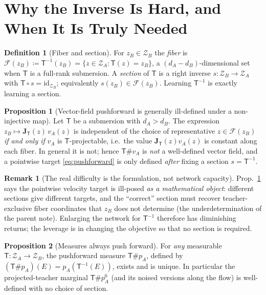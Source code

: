 \documentclass[11pt,a4paper]{article}
\newcommand{\Za}{\mathcal{Z}_{A}}
\newcommand{\Zb}{\mathcal{Z}_{B}}
\newcommand{\Tmap}{\mathsf{T}}
\newcommand{\Tinv}{\mathsf{T}^{-1}}
\newcommand{\push}{\#}
\newcommand{\Jac}{\mathbf{J}}
\theoremstyle{definition}
\newtheorem{definition}{Definition}
\newtheorem{proposition}{Proposition}
\newtheorem{remark}{Remark}
\begin{document}
\section{Why the Inverse Is Hard, and When It Is Truly Needed}
\label{sec:why}

\begin{definition}[Fiber and section]
\label{def:section}
For $z_B\in\Zb$ the \emph{fiber} is $\mathcal{F}(z_B)\coloneqq\Tmap^{-1}(z_B)=\{z\in\Za:\Tmap(z)=z_B\}$,
a $(d_A-d_B)$-dimensional set when $\Tmap$ is a full-rank submersion. A \emph{section} of $\Tmap$
is a right inverse $s:\Zb\to\Za$ with $\Tmap\circ s=\mathrm{id}_{\Zb}$; equivalently $s(z_B)\in\mathcal{F}(z_B)$.
Learning $\Tinv$ is exactly learning a section.
\end{definition}

\begin{proposition}[Vector-field pushforward is generally ill-defined under a non-injective map]
\label{prop:projectability}
Let $\Tmap$ be a submersion with $d_A>d_B$. The expression
$z_B\mapsto \Jac_{\Tmap}(z)\,v_A(z)$ is independent of the choice of representative
$z\in\mathcal{F}(z_B)$ \emph{if and only if} $v_A$ is $\Tmap$-projectable, i.e.\ the value
$\Jac_{\Tmap}(z)v_A(z)$ is constant along each fiber. In general it is not; hence
$\Tmap\push v_A$ is \emph{not} a well-defined vector field, and a pointwise target
\eqref{eq:pushforward} is only defined \emph{after} fixing a section $s=\Tinv$.
\end{proposition}

\begin{remark}[The real difficulty is the formulation, not network capacity]
\label{rem:formulation}
Prop.~\ref{prop:projectability} says the pointwise velocity target is ill-posed \emph{as a
mathematical object}: different sections give different targets, and the ``correct'' section
must recover teacher-exclusive fiber coordinates that $z_B$ does not determine
(the underdetermination of the parent note). Enlarging the network for $\Tinv$ therefore has
diminishing returns; the leverage is in changing the objective so that no section is required.
\end{remark}

\begin{proposition}[Measures always push forward]
\label{prop:measure}
For \emph{any} measurable $\Tmap:\Za\to\Zb$, the pushforward measure $\Tmap\push p_A$, defined
by $(\Tmap\push p_A)(E)=p_A(\Tmap^{-1}(E))$, exists and is unique. In particular the
projected-teacher marginal $\Tmap\push p_A^{0}$ (and its noised versions along the flow) is
well-defined with no choice of section.
\end{proposition}
\end{document}

